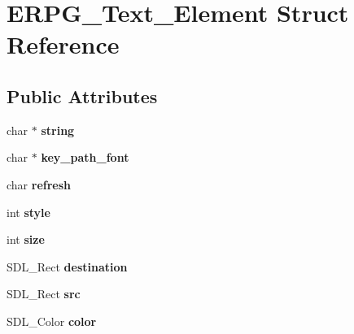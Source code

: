 \hypertarget{structERPG__Text__Element}{\section{E\-R\-P\-G\-\_\-\-Text\-\_\-\-Element Struct Reference}
\label{structERPG__Text__Element}
}
\subsection*{Public Attributes}
\begin{DoxyCompactItemize}
\item 
\hypertarget{structERPG__Text__Element_a0588a88d2f11229e4d295d049a8c1467}{char $\ast$ {\bfseries string}}\label{structERPG__Text__Element_a0588a88d2f11229e4d295d049a8c1467}

\item 
\hypertarget{structERPG__Text__Element_af1a2f9ff4c8b2000715ecc50ccce0056}{char $\ast$ {\bfseries key\-\_\-path\-\_\-font}}\label{structERPG__Text__Element_af1a2f9ff4c8b2000715ecc50ccce0056}

\item 
\hypertarget{structERPG__Text__Element_afc16e13fbf7ea6dcca3c6e95ee987cba}{char {\bfseries refresh}}\label{structERPG__Text__Element_afc16e13fbf7ea6dcca3c6e95ee987cba}

\item 
\hypertarget{structERPG__Text__Element_a03aff285eb931978bd64a5a2ea9e0599}{int {\bfseries style}}\label{structERPG__Text__Element_a03aff285eb931978bd64a5a2ea9e0599}

\item 
\hypertarget{structERPG__Text__Element_a03a4a70f8c94d53136d55448704d1b2d}{int {\bfseries size}}\label{structERPG__Text__Element_a03a4a70f8c94d53136d55448704d1b2d}

\item 
\hypertarget{structERPG__Text__Element_abc5c2b61e409a4c83b16316a40293e74}{S\-D\-L\-\_\-\-Rect {\bfseries destination}}\label{structERPG__Text__Element_abc5c2b61e409a4c83b16316a40293e74}

\item 
\hypertarget{structERPG__Text__Element_a5273c490b803f85e18da278281bf05a0}{S\-D\-L\-\_\-\-Rect {\bfseries src}}\label{structERPG__Text__Element_a5273c490b803f85e18da278281bf05a0}

\item 
\hypertarget{structERPG__Text__Element_a96133fb3f126049b155ba5776de1c01c}{S\-D\-L\-\_\-\-Color {\bfseries color}}\label{structERPG__Text__Element_a96133fb3f126049b155ba5776de1c01c}


\end{DoxyCompactItemize}
